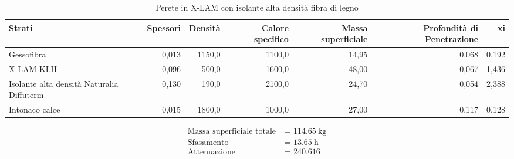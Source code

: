 \begin{table}
\centering
\caption{Perete in X-LAM con isolante alta densità fibra di legno}
\begin{tabular}{lrrrrrr}
\toprule
                                    Strati & Spessori & Densità & Calore specifico & Massa superficiale & Profondità di Penetrazione &     xi \\
\midrule
                                Gessofibra &    0,013 &  1150,0 &           1100,0 &              14,95 &                      0,068 &  0,192 \\
                                 X-LAM KLH &    0,096 &   500,0 &           1600,0 &              48,00 &                      0,067 &  1,436 \\
 Isolante alta densità Naturalia Diffuterm &    0,130 &   190,0 &           2100,0 &              24,70 &                      0,054 &  2,388 \\
                            Intonaco calce &    0,015 &  1800,0 &           1000,0 &              27,00 &                      0,117 &  0,128 \\
\bottomrule
\end{tabular}
\end{table}

\begin{flushleft}
\begin{align*}
\text{Massa superficiale totale} &= \SI{114.65}{\kilo\gram}\\
\text{Sfasamento} &= \SI{13.65}{\hour}\\
\text{Attenuazione} &= \SI{240.616}{}
\end{align*}
\end{flushleft}
